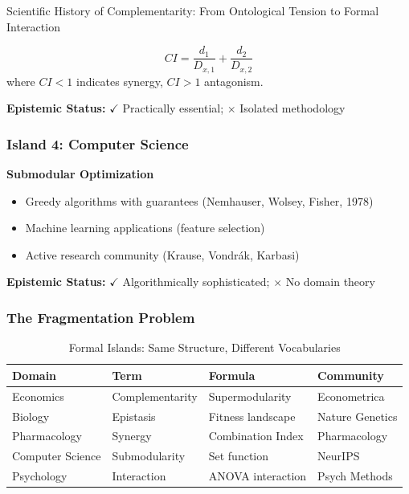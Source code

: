 \begin{chapter}{Scientific History of Complementarity: From Ontological Tension to Formal Interaction}
\begin{definition}
\[
CI = \frac{d_1}{D_{x,1}} + \frac{d_2}{D_{x,2}}
\]
where $CI < 1$ indicates synergy, $CI > 1$ antagonism.
\end{definition}

\textbf{Epistemic Status:} $\checkmark$ Practically essential; $\times$ Isolated methodology

\subsubsection{Island 4: Computer Science}

\textbf{Submodular Optimization}
\begin{itemize}[noitemsep]
    \item Greedy algorithms with guarantees (Nemhauser, Wolsey, Fisher, 1978)
    \item Machine learning applications (feature selection)
    \item Active research community (Krause, Vondrák, Karbasi)
\end{itemize}

\textbf{Epistemic Status:} $\checkmark$ Algorithmically sophisticated; $\times$ No domain theory

\subsubsection{The Fragmentation Problem}

\begin{table}[h]
\centering
\caption{Formal Islands: Same Structure, Different Vocabularies}
\label{tab:formal-islands}
\renewcommand{\arraystretch}{1.3}
\begin{tabular}{@{}llll@{}}
\toprule
\textbf{Domain} & \textbf{Term} & \textbf{Formula} & \textbf{Community} \\
\midrule
Economics & Complementarity & Supermodularity & Econometrica \\
Biology & Epistasis & Fitness landscape & Nature Genetics \\
Pharmacology & Synergy & Combination Index & Pharmacology \\
Computer Science & Submodularity & Set function & NeurIPS \\
Psychology & Interaction & ANOVA interaction & Psych Methods \\
\bottomrule
\end{tabular}
\end{table}


\end{chapter}

